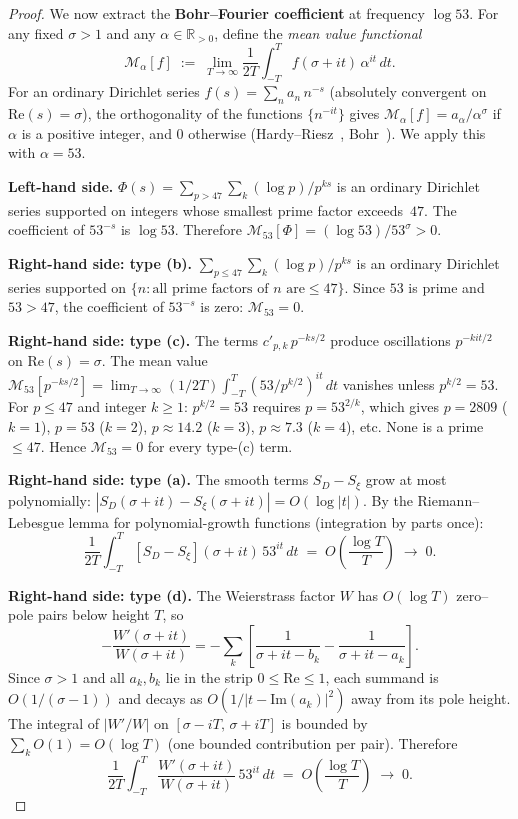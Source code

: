 \documentclass[11pt,a4paper]{article}
\theoremstyle{plain}
\theoremstyle{remark}
\newcommand{\R}{\mathbb{R}}
\begin{document}
\begin{proof}
We now extract the \textbf{Bohr--Fourier coefficient} at
frequency $\log 53$.  For any fixed $\sigma>1$ and any
$\alpha\in\R_{>0}$, define the \emph{mean value functional}
\begin{equation}\label{eq:mean-value}
  \mathcal{M}_\alpha[f]
  \;:=\;
  \lim_{T\to\infty}\frac{1}{2T}
  \int_{-T}^{T} f(\sigma+it)\,\alpha^{it}\,dt.
\end{equation}
For an ordinary Dirichlet series
$f(s) = \sum_n a_n\,n^{-s}$ (absolutely convergent
on $\mathrm{Re}(s)=\sigma$), the
orthogonality of the functions $\{n^{-it}\}$ gives
$\mathcal{M}_\alpha[f] = a_\alpha/\alpha^\sigma$
if $\alpha$ is a positive integer, and $0$ otherwise
(Hardy--Riesz~\cite{hardy-riesz1915},
Bohr~\cite{bohr1913}).  We apply this with $\alpha = 53$.

\medskip\noindent
\textbf{Left-hand side.}\enspace
$\Phi(s) = \sum_{p>47}\sum_k (\log p)/p^{ks}$ is an ordinary
Dirichlet series supported on integers whose smallest prime factor
exceeds~$47$.  The coefficient of $53^{-s}$ is $\log 53$.  Therefore
$\mathcal{M}_{53}[\Phi] = (\log 53)/53^\sigma > 0$.

\medskip\noindent
\textbf{Right-hand side: type (b).}\enspace
$\sum_{p\leq 47}\sum_k (\log p)/p^{ks}$ is an ordinary Dirichlet
series supported on $\{n : \text{all prime factors of }n\text{ are}
\leq 47\}$.  Since $53$ is prime and $53>47$, the coefficient of
$53^{-s}$ is zero: $\mathcal{M}_{53} = 0$.

\medskip\noindent
\textbf{Right-hand side: type (c).}\enspace
The terms $c'_{p,k}\,p^{-ks/2}$ produce oscillations $p^{-kit/2}$
on $\mathrm{Re}(s)=\sigma$.  The mean value
$\mathcal{M}_{53}[p^{-ks/2}]
= \lim_{T\to\infty}(1/2T)\int_{-T}^{T}(53/p^{k/2})^{it}\,dt$
vanishes unless $p^{k/2}=53$.  For $p\leq 47$ and integer $k\geq 1$:
$p^{k/2}=53$ requires $p=53^{2/k}$, which gives
$p=2809$ ($k=1$), $p=53$ ($k=2$), $p\approx 14.2$ ($k=3$),
$p\approx 7.3$ ($k=4$), etc.  None is a prime $\leq 47$.
Hence $\mathcal{M}_{53} = 0$ for every type-(c) term.

\medskip\noindent
\textbf{Right-hand side: type (a).}\enspace
The smooth terms $S_D-S_\xi$ grow at most polynomially:
$|S_D(\sigma{+}it)-S_\xi(\sigma{+}it)| = O(\log|t|)$.
By the Riemann--Lebesgue lemma for polynomial-growth functions
(integration by parts once):
\[
  \frac{1}{2T}\int_{-T}^{T}
  [S_D-S_\xi](\sigma{+}it)\,53^{it}\,dt
  \;=\; O\!\left(\frac{\log T}{T}\right)
  \;\to\; 0.
\]

\medskip\noindent
\textbf{Right-hand side: type (d).}\enspace
The Weierstrass factor $W$ has $O(\log T)$ zero--pole pairs below
height $T$, so
\[
  -\frac{W'(\sigma{+}it)}{W(\sigma{+}it)}
  = -\sum_k\left[\frac{1}{\sigma{+}it-b_k}
    -\frac{1}{\sigma{+}it-a_k}\right].
\]
Since $\sigma>1$ and all $a_k,b_k$ lie in the strip
$0\leq\mathrm{Re}\leq 1$, each summand is $O(1/(\sigma{-}1))$ and
decays as $O(1/|t{-}\mathrm{Im}(a_k)|^2)$ away from its pole height.
The integral of $|W'/W|$ on $[\sigma{-}iT,\,\sigma{+}iT]$ is
bounded by $\sum_k O(1) = O(\log T)$ (one bounded contribution per
pair).  Therefore
\[
  \frac{1}{2T}\int_{-T}^{T}
  \frac{W'(\sigma{+}it)}{W(\sigma{+}it)}\,53^{it}\,dt
  \;=\; O\!\left(\frac{\log T}{T}\right) \;\to\; 0.
\]


\end{proof}
\end{document}
